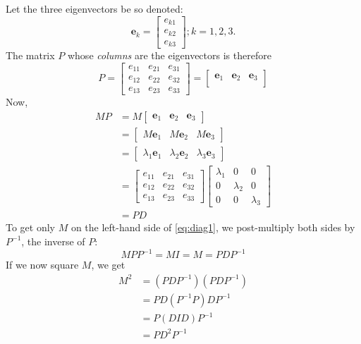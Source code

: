 \documentclass[
  11pt,
  a4paper,
]{article}
\begin{document}
Let the three eigenvectors be so denoted: \[
\symbf{e}_{k} = \begin{bmatrix}
e_{k1}\\
e_{k2}\\
e_{k3}
\end{bmatrix} ; k = 1, 2, 3.
\] The matrix \(P\) whose \emph{columns} are the eigenvectors is
therefore \[
P = \begin{bmatrix}
e_{11} & e_{21} & e_{31}\\
e_{12} & e_{22} & e_{32}\\
e_{13} & e_{23} & e_{33}
\end{bmatrix}
= \begin{bmatrix}
\symbf{e}_{1} & \symbf{e}_{2} & \symbf{e}_{3}\\
\end{bmatrix}
\] Now, \begin{equation}
\begin{aligned}
MP &= M\begin{bmatrix}
\symbf{e}_{1} & \symbf{e}_{2} & \symbf{e}_{3}
\end{bmatrix}\\
&= \begin{bmatrix}
M\symbf{e}_{1} & M\symbf{e}_{2} & M\symbf{e}_{3}
\end{bmatrix}\\
&= \begin{bmatrix}
\lambda_{1}\symbf{e}_{1} & \lambda_{2}\symbf{e}_{2} & \lambda_{3}\symbf{e}_{3}
\end{bmatrix}\\
&= \begin{bmatrix}
e_{11} & e_{21} & e_{31}\\
e_{12} & e_{22} & e_{32}\\
e_{13} & e_{23} & e_{33}
\end{bmatrix}
\begin{bmatrix}
\lambda_{1} & 0 & 0\\
0 & \lambda_{2} & 0\\
0 & 0 & \lambda_{3}
\end{bmatrix}\\
&= PD
\end{aligned}
\label{eq:diag1}\end{equation} To get only \(M\) on the left-hand side
of \cref{eq:diag1}, we post-multiply both sides by \(P^{-1}\), the
inverse of \(P\): \begin{equation}
MPP^{-1} = MI = M = PDP^{-1}
\label{eq:eigendecomp}\end{equation} If we now square \(M\), we get
\begin{equation}
\begin{aligned}
M^{2} &= (PDP^{-1})(PDP^{-1})\\
&= PD(P^{-1}P)DP^{-1}\\
&= P(DID)P^{-1}\\
&= PD^{2}P^{-1}
\end{aligned}
\label{eq:D-squared}\end{equation}
\end{document}
